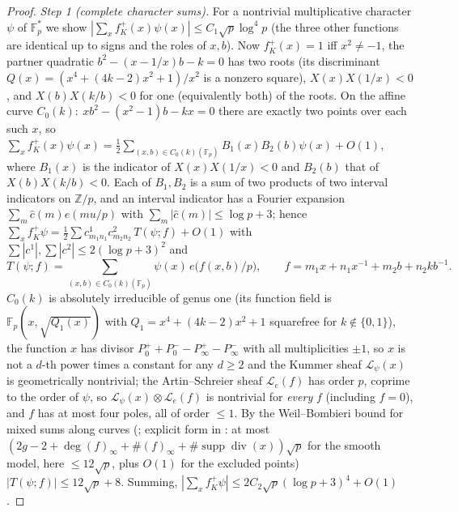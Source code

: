 \documentclass[11pt]{article}
\theoremstyle{remark}
\newcommand{\Fp}{\mathbb{F}_p}
\newcommand{\Z}{\mathbb{Z}}
\begin{document}
\begin{proof}
\emph{Step 1 (complete character sums).}  For a nontrivial multiplicative character $\psi$ of $\Fp^*$ we show
$|\sum_xf^+_K(x)\psi(x)|\le C_1\sqrt p\log^4p$ (the three other functions are identical up to signs and the roles of $x,b$).  Now
$f^+_K(x)=1$ iff $x^2\ne-1$, the partner quadratic $b^2-(x-1/x)b-k=0$ has two roots (its discriminant $Q(x)=(x^4+(4k-2)x^2+1)/x^2$ is a
nonzero square), $X(x)X(1/x)<0$, and $X(b)X(k/b)<0$ for one (equivalently both) of the roots.  On the affine curve
$C_0(k):\ xb^2-(x^2-1)b-kx=0$ there are exactly two points over each such $x$, so
$\sum_xf^+_K(x)\psi(x)=\tfrac12\sum_{(x,b)\in C_0(k)(\Fp)}B_1(x)B_2(b)\psi(x)+O(1)$, where $B_1(x)$ is the indicator of
$X(x)X(1/x)<0$ and $B_2(b)$ that of $X(b)X(k/b)<0$.  Each of $B_1,B_2$ is a sum of two products of two interval indicators on $\Z/p$, and an interval
indicator has a Fourier expansion $\sum_m\hat c(m)e(mu/p)$ with $\sum_m|\hat c(m)|\le\log p+3$; hence
$\sum_xf^+_K\psi=\tfrac12\sum c^1_{m_1n_1}c^2_{m_2n_2}\,T(\psi;f)+O(1)$ with $\sum|c^1|,\sum|c^2|\le2(\log p+3)^2$ and
\[
 T(\psi;f)=\sum_{(x,b)\in C_0(k)(\Fp)}\psi(x)\,e\bigl(f(x,b)/p\bigr),\qquad f=m_1x+n_1x^{-1}+m_2b+n_2kb^{-1}.
\]
$C_0(k)$ is absolutely irreducible of genus one (its function field is $\Fp(x,\sqrt{Q_1(x)})$ with $Q_1=x^4+(4k-2)x^2+1$ squarefree for
$k\notin\{0,1\}$), the function $x$ has divisor $P_0^++P_0^--P_\infty^+-P_\infty^-$ with all multiplicities $\pm1$, so $x$ is not a $d$-th power
times a constant for any $d\ge2$ and the Kummer sheaf $\mathcal L_\psi(x)$ is geometrically nontrivial; the Artin--Schreier sheaf
$\mathcal L_e(f)$ has order $p$, coprime to the order of $\psi$, so $\mathcal L_\psi(x)\otimes\mathcal L_e(f)$ is nontrivial for \emph{every} $f$
(including $f=0$), and $f$ has at most four poles, all of order $\le1$.  By the Weil--Bombieri bound for mixed sums along curves
(\cite{Perelmuter}; explicit form in \cite[Thm.~1]{CastroMoreno}: at most $(2g-2+\deg(f)_\infty+\#(f)_\infty+\#\operatorname{supp}\operatorname{div}(x))\sqrt p$
for the smooth model, here $\le12\sqrt p$, plus $O(1)$ for the excluded points) $|T(\psi;f)|\le12\sqrt p+8$.  Summing, $|\sum_xf^+_K\psi|\le
2C_2\sqrt p(\log p+3)^4+O(1)$.


\end{proof}
\end{document}
